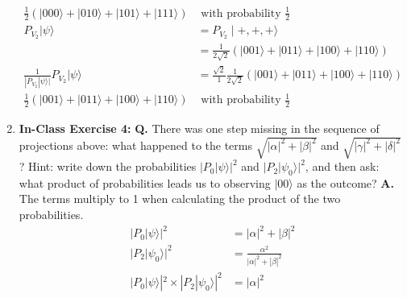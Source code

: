 \documentclass[main.tex]{subfiles}
\begin{document}
\begin{enumerate}
\begin{align*}
        \frac{1}{2}(|000\rangle+|010\rangle
        +|101\rangle+|111\rangle)           & \text{ with probability } \frac{1}{2}\\
        P_{V_{2}}|\psi\rangle               & = P_{V_{2}}\mid+,+,+\rangle\\
                                            & = \frac{1}{2\sqrt{2}}\left(|001\rangle+|011\rangle
                                            +|100\rangle+|110\rangle\right)\\
        \frac{1}{|P_{V_{2}}|\psi\rangle|}
        P_{V_{2}}|\psi\rangle               & = \frac{\sqrt{2}}{1}\frac{1}{2\sqrt{2}}\left(|001\rangle+|011\rangle
                                            +|100\rangle+|110\rangle\right)\\
        \frac{1}{2}(|001\rangle+|011\rangle
        +|100\rangle+|110\rangle)     & \text{ with probability } \frac{1}{2}
    \end{align*}

\item[] \textbf{In-Class Exercise 4:} \textbf{Q.} There was one step missing in the sequence of projections above: what happened to the terms $\sqrt{|\alpha|^{2}+|\beta|^{2}}$ and $\sqrt{|\gamma|^{2}+|\delta|^{2}}$ ? Hint: write down the probabilities  $|P_{0}| \psi\rangle|^{2}$ and $|P_{2}| \psi_{0}\rangle|^{2}$, and then ask: what product of probabilities leads us to observing $|00\rangle$ as the outcome? \textbf{A.} The terms multiply to 1 when calculating the product of the two probabilities.
    \begin{align*}
        |P_{0}| \psi\rangle|^{2}        & = |\alpha|^{2}+|\beta|^{2}\\
        |P_{2}| \psi_{0}\rangle|^{2}    & = \frac{\alpha^2}{|\alpha|^{2}+|\beta|^{2}}\\
        |P_{0}| \psi\rangle|^{2} 
        \times |P_{2}| 
        \psi_{0}\rangle|^{2}            & = |\alpha|^2
    \end{align*}


\end{enumerate}
\end{document}
